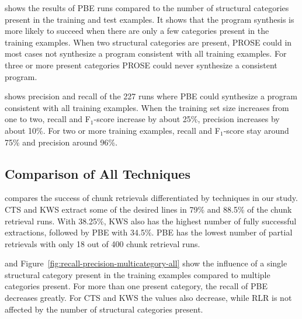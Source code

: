  shows the results of PBE runs compared to the number of structural categories present in the training and test examples.
It shows that the program synthesis is more likely to succeed when there are only a few categories present in the training examples.
When two structural categories are present, PROSE could in most cases not synthesize a program consistent with all training examples.
For three or more present categories PROSE could never synthesize a consistent program.

 shows precision and recall of the 227 runs where PBE could synthesize a program consistent with all training examples.
When the training set size increases from one to two, recall and F$_{1}$-score increase by about 25\%, precision increases by about 10\%.
For two or more training examples, recall and F$_{1}$-score stay around 75\% and precision around 96\%.


\subsection{Comparison of All Techniques}
 compares the success of chunk retrievals differentiated by techniques in our study.
CTS and KWS extract some of the desired lines in 79\% and 88.5\% of the chunk retrieval runs.
With 38.25\%, KWS also has the highest number of fully successful extractions, followed by PBE with 34.5\%.
PBE has the lowest number of partial retrievals with only 18 out of 400 chunk retrieval runs.


 and Figure~\ref{fig:recall-precision-multicategory-all} show the influence of a single structural category present in the training examples compared to multiple categories present.
For more than one present category, the recall of PBE decreases greatly.
For CTS and KWS the values also decrease, while RLR is not affected by the number of structural categories present.

